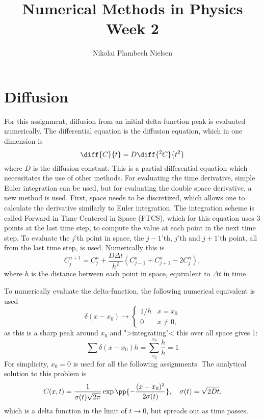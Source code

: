 \documentclass[a4paper,10pt]{article} 	%
\title{Numerical Methods in Physics Week 2}
\author{Nikolai Plambech Nielsen}
\date{}
\numberwithin{equation}{section}
\begin{document}
	\maketitle
	\section{Diffusion}
	For this assignment, diffusion from an initial delta-function peak is evaluated numerically. The differential equation is the diffusion equation, which in one dimension is
	\begin{equation}\label{key}
		\diff{C}{t} = D \diff{^2 C}{t^2}
	\end{equation}
	where $ D $ is the diffusion constant. This is a partial differential equation which necessitates the use of other methods. For evaluating the time derivative, simple Euler integration can be used, but for evaluating the double space derivative, a new method is used. First, space needs to be discretized, which allows one to calculate the derivative similarly to Euler integration. The integration scheme is called Forward in Time Centered in Space (FTCS), which for this equation uses 3 points at the last time step, to compute the value at each point in the next time step. To evaluate the $ j $'th point in space, the $ j-1 $'th, $ j $'th and $ j+1 $'th point, all from the last time step, is used. Numerically this is
	\begin{equation}
		C^{n+1}_j = C^n_j + \frac{D \Delta t}{h^2} (C^n_{j-1}+C^n_{j+1} - 2 C^n_j),
	\end{equation}
	where $ h $ is the distance between each point in space, equivalent to $ \Delta t $ in time.
	
	To numerically evaluate the delta-function, the following numerical equivalent is used
	\begin{equation}\label{key}
		\delta(x-x_0) \to \begin{cases}
		1/h & x = x_0 \\
		0 & x \neq 0,
 		\end{cases}
	\end{equation}
	as this is a sharp peak around $ x_0 $ and ">integrating"< this over all space gives 1:
	\begin{equation}\label{key}
		\sum \delta(x-x_0) h = \sum_{x_0}^{x_0} \frac{h}{h} = 1
	\end{equation}
	For simplicity, $ x_0 = 0 $ is used for all the following assignments. The analytical solution to this problem is
	\begin{equation}\label{key}
		C(x,t) = \frac{1}{\sigma(t) \sqrt{2\pi}} \exp\pp{-\frac{(x-x_0)^2}{2\sigma(t)}}, \quad \sigma(t) = \sqrt{2Dt}.
	\end{equation}
	which is a delta function in the limit of $ t\to 0 $, but spreads out as time passes.
	
	
	
\end{document}
